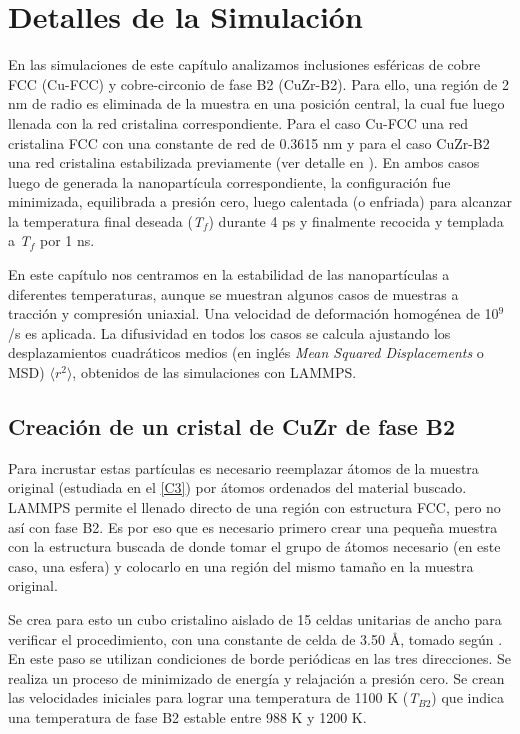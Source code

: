 
\section{Detalles de la Simulación}
\label{S4_1}

En las simulaciones de este capítulo analizamos inclusiones esféricas de cobre FCC (Cu-FCC) y cobre-circonio de fase B2 (CuZr-B2). Para ello, una región de 2 nm de radio es eliminada de la muestra en una posición central, la cual fue luego llenada con la red cristalina correspondiente. Para el caso Cu-FCC una red cristalina FCC con una constante de red de 0.3615 nm y para el caso CuZr-B2 una red cristalina estabilizada previamente (ver detalle en ). En ambos casos luego de generada la nanopartícula correspondiente, la configuración fue minimizada, equilibrada a presión cero, luego calentada (o enfriada) para alcanzar la temperatura final deseada (\textit{T$_{f}$}) durante 4 ps y finalmente recocida y templada a \textit{T$_{f}$} por 1 ns.

En este capítulo nos centramos en la estabilidad de las nanopartículas a diferentes temperaturas, aunque se muestran algunos casos de muestras a tracción y compresión uniaxial. Una velocidad de deformación homogénea de 10$^{9}$/s es aplicada. La difusividad en todos los casos se calcula ajustando los desplazamientos cuadráticos medios (en inglés \textit{Mean Squared Displacements} o MSD) $\langle r^{2}\rangle$, obtenidos de las simulaciones con LAMMPS.

\subsection{Creación de un cristal de CuZr de fase B2}
\label{S4_1_1}

Para incrustar estas partículas es necesario reemplazar átomos de la muestra original (estudiada en el \cref{C3}) por átomos ordenados del material buscado. LAMMPS permite el llenado directo de una región con estructura FCC, pero no así con fase B2. Es por eso que es necesario  primero crear una pequeña muestra con la estructura buscada de donde tomar el grupo de átomos necesario (en este caso, una esfera) y colocarlo en una región del mismo tamaño en la muestra original.

Se crea para esto un cubo cristalino aislado de 15 celdas unitarias de ancho para verificar el procedimiento, con una constante de celda de 3.50 \AA{}, tomado según \cite{inoue04}. En este paso se utilizan condiciones de borde periódicas en las tres direcciones. Se realiza un proceso de minimizado de energía y relajación a presión cero. Se crean las velocidades iniciales para lograr una temperatura de 1100 K (\textit{T$_{B2}$}) \citep{pauly10} que indica una temperatura de fase B2 estable entre 988 K y 1200 K. 

